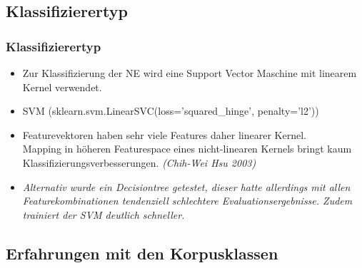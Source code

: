 \documentclass{beamer}
\begin{document}
	\subsection{Klassifizierertyp}
	\begin{frame}
		\frametitle{Klassifizierertyp}
		\begin{itemize}
			\item<+->Zur Klassifizierung der NE wird eine Support Vector Maschine mit linearem Kernel verwendet.
			\item<+-> SVM (sklearn.svm.LinearSVC(loss=’squared\_hinge’, penalty='l2'))
						
			\item<+-> Featurevektoren haben sehr viele Features
			daher linearer Kernel.\\
			Mapping in höheren Featurespace eines nicht-linearen Kernels bringt kaum Klassifizierungsverbesserungen. \textit{(Chih-Wei Hsu 2003)}
			\item<+->\textit{Alternativ wurde ein Decisiontree getestet, dieser hatte allerdings mit allen Featurekombinationen tendenziell schlechtere Evaluationsergebnisse. Zudem trainiert der SVM deutlich schneller.}
		\end{itemize}
	\end{frame}

	\subsection{Erfahrungen mit den Korpusklassen}
\end{document}
